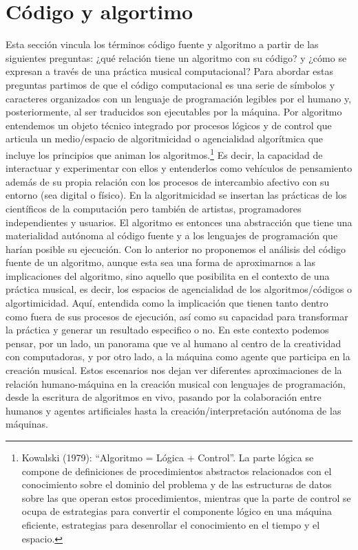 \section{Código y algortimo}
Esta sección vincula los términos código fuente y algoritmo a partir de las siguientes preguntas: ¿qué relación tiene un algoritmo con su código? y ¿cómo se expresan a través de una práctica musical computacional? Para abordar estas preguntas partimos de que el código computacional es una serie de símbolos y caracteres organizados con un lenguaje de programación legibles por el humano y, posteriormente, al ser traducidos son ejecutables por la máquina. Por algoritmo entendemos un objeto técnico integrado por procesos lógicos y de control que articula un medio/espacio de algoritmicidad o agencialidad algorítmica que incluye los principios que animan los algoritmos.\footnote{Kowalski (1979): “Algoritmo = Lógica + Control”. La parte lógica se compone de definiciones de procedimientos abstractos relacionados con el conocimiento sobre el dominio del problema y de las estructuras de datos sobre las que operan estos procedimientos, mientras que la parte de control se ocupa de estrategias para convertir el componente lógico en una máquina eficiente, estrategias para desenrollar el conocimiento en el tiempo y el espacio.} Es decir, la capacidad de interactuar y experimentar con ellos y entenderlos como vehículos de pensamiento además de su propia relación con los procesos de intercambio afectivo con su entorno (sea digital o físico). En la algoritmicidad se insertan las prácticas de los científicos de la computación pero también de artistas, programadores independientes y usuarios. El algoritmo es entonces una abstracción que tiene una materialidad autónoma al código fuente y a los lenguajes de programación que harían posible su ejecución.
Con lo anterior no proponemos el análisis del código fuente de un algoritmo, aunque esta sea una forma de aproximarnos a las implicaciones del algoritmo, sino aquello que posibilita en el contexto de una práctica musical, es decir, los espacios de agencialidad de los algoritmos/códigos o algortimicidad. Aquí, entendida como la implicación que tienen tanto dentro como fuera de sus procesos de ejecución, así como su capacidad para transformar la práctica y generar un resultado especifico o no. En este contexto podemos pensar, por un lado, un panorama que ve al humano al centro de la creatividad con computadoras, y por otro lado, a la máquina como agente que participa en la creación musical. Estos escenarios nos dejan ver diferentes aproximaciones de la relación humano-máquina en la creación musical con lenguajes de programación, desde la escritura de algoritmos en vivo, pasando por la colaboración entre humanos y agentes artificiales hasta la creación/interpretación autónoma de las máquinas.

